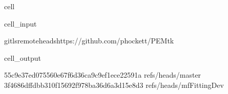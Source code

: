 \documentclass[letterpaper,table,10pt,english]{jupyterBook}
\begin{document}
\begin{sphinxuseclass}{cell}\begin{sphinxVerbatimInput}

\begin{sphinxuseclass}{cell_input}
\begin{sphinxVerbatim}[commandchars=\\\{\}]
gitls\PYGZhy{}remote\PYGZhy{}\PYGZhy{}headshttps://github.com/phockett/PEMtk
\end{sphinxVerbatim}

\end{sphinxuseclass}\end{sphinxVerbatimInput}
\begin{sphinxVerbatimOutput}

\begin{sphinxuseclass}{cell_output}
\begin{sphinxVerbatim}[commandchars=\\\{\}]
55c9e37ed075560e67f6d36ca9c9ef1ece22591a	refs/heads/master
3f4686dffdbb310f15692f978ba36d6a3d15e8d3	refs/heads/mfFittingDev
\end{sphinxVerbatim}

\end{sphinxuseclass}\end{sphinxVerbatimOutput}

\end{sphinxuseclass}
\end{document}
